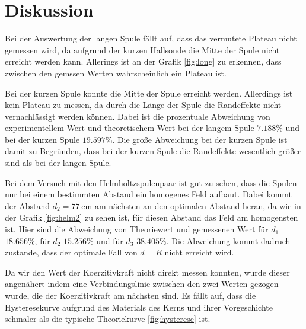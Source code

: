 \section{Diskussion}
\label{sec:Diskussion}

Bei der Auswertung der langen Spule fällt auf, dass das vermutete Plateau nicht gemessen wird, da aufgrund der kurzen Hallsonde die Mitte der Spule nicht erreicht werden kann.
Allerings ist an der Grafik \ref{fig:long} zu erkennen, dass zwischen den gemssen Werten wahrscheinlich ein Plateau ist.

Bei der kurzen Spule konnte die Mitte der Spule erreicht werden. 
Allerdings ist kein Plateau zu messen, da durch die Länge der Spule die Randeffekte nicht vernachlässigt werden können.
Dabei ist die prozentuale Abweichung von experimentellem Wert und theoretischem Wert bei der langem Spule $7.188\%$ und bei der kurzen Spule $19.597\%$.
Die große Abweichung bei der kurzen Spule ist damit zu Begründen, dass bei der kurzen Spule die Randeffekte wesentlich größer sind als bei der langen Spule.

Bei dem Versuch mit den Helmholtzspulenpaar ist gut zu sehen, dass die Spulen nur bei einem bestimmten Abstand ein homogenes Feld aufbaut.
Dabei kommt der Abstand $d_2=7\SI{7}{\centi\meter}$ am nächsten an den optimalen Abstand heran, da wie in der Grafik \ref{fig:helm2} zu sehen ist, für diesen Abstand das Feld am homogensten ist.
Hier sind die Abweichung von Theoriewert und gemessenen Wert für $d_1$ $18.656\%$, für $d_2$ $15.256 \%$ und für $d_3$ $38.405 \%$.
Die Abweichung kommt dadruch zustande, dass der optimale Fall von $d=R$ nicht erreicht wird.

Da wir den Wert der Koerzitivkraft nicht direkt messen konnten, wurde dieser angenähert indem eine Verbindungslinie zwischen den zwei Werten gezogen wurde, die der Koerzitivkraft am nächsten sind.
Es fällt auf, dass die Hysteresekurve aufgrund des Materials des Kerns und ihrer Vorgeschichte schmaler als die typische Theoriekurve \ref{fig:hysterese} ist.